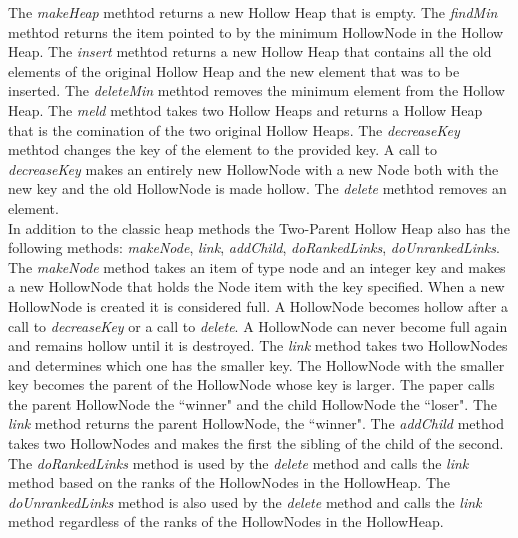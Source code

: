 \documentclass[letter,10pt]{article}
\begin{document}
\quad The \textit{makeHeap} methtod returns a new Hollow Heap that is empty. The \textit{findMin} methtod returns the item pointed to by the minimum HollowNode in the Hollow Heap. The \textit{insert} methtod returns a new Hollow Heap that contains all the old elements of the original Hollow Heap and the new element that was to be inserted. The \textit{deleteMin} methtod removes the minimum element from the Hollow Heap. The \textit{meld} methtod takes two Hollow Heaps and returns a Hollow Heap that is the comination of the two original Hollow Heaps. The \textit{decreaseKey} methtod changes the key of the element to the provided key. A call to \textit{decreaseKey} makes an entirely new HollowNode with a new Node both with the new key and the old HollowNode is made hollow. The \textit{delete} methtod removes an element.\\ 

\quad In addition to the classic heap methods the Two-Parent Hollow Heap also has the following methods: \textit{makeNode}, \textit{link}, \textit{addChild}, \textit{doRankedLinks}, \textit{doUnrankedLinks}. The \textit{makeNode} method takes an item of type node and an integer key and makes a new HollowNode that holds the Node item with the key specified. When a new HollowNode is created it is considered full.  A HollowNode becomes hollow after a call to \textit{decreaseKey} or a call to \textit{delete}. A HollowNode can never become full again and remains hollow until it is destroyed. The \textit{link} method takes two HollowNodes and determines which one has the smaller key. The HollowNode with the smaller key becomes the parent of the HollowNode whose key is larger. The paper calls the parent HollowNode the ``winner" and the child HollowNode the ``loser". The \textit{link} method returns the parent HollowNode, the ``winner". The \textit{addChild} method takes two HollowNodes and makes the first the sibling of the child of the second. The \textit{doRankedLinks} method is used by the \textit{delete} method and calls the \textit{link} method based on the ranks of the HollowNodes in the HollowHeap. The \textit{doUnrankedLinks} method is also used by the \textit{delete} method and calls the \textit{link} method regardless of the ranks of the HollowNodes in the HollowHeap.\\ 
\end{document}
